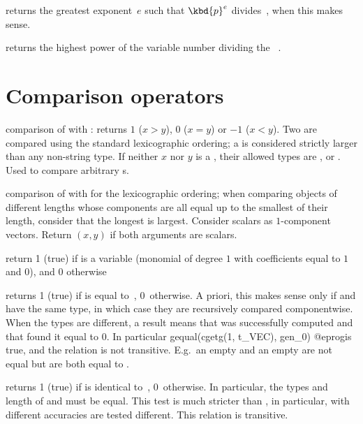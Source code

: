  returns the greatest exponent~$e$ such that
$\kbd{p}^e$ divides~, when this makes sense.

 returns the highest power of the variable
number  dividing the ~.

\section{Comparison operators}


 comparison of  with : returns
$1$ ($x > y$), $0$ ($x = y$) or $-1$ ($x < y$). Two 
are compared using the standard lexicographic ordering; a 
is considered strictly larger than any non-string type. If neither
$x$ nor $y$ is a , their allowed types are , 
or . Used  to compare arbitrary s.

 comparison of  with  for the
lexicographic ordering; when comparing objects of different lengths whose
components are all equal up to the smallest of their length, consider that
the longest is largest. Consider scalars as $1$-component vectors. Return
$(x,y)$ if both arguments are scalars.

 return 1 (true) if  is a variable
(monomial of degree $1$ with  coefficients equal to $1$ and $0$),
and $0$ otherwise

 returns 1 (true) if  is equal
to~, 0~otherwise. A priori, this makes sense only if  and
 have the same type, in which case they are recursively compared
componentwise. When the types are different, a  result
means that  was successfully computed and that
 found it equal to $0$. In particular
\bprog
  gequal(cgetg(1, t_VEC), gen_0)
@eprog\noindent is true, and the relation is not transitive. E.g.~an empty
 and an empty  are not equal but are both equal to
.

 returns 1 (true) if  is identical
to~, 0~otherwise. In particular, the types and length of  and
 must be equal. This test is much stricter than , in
particular,  with different accuracies are tested different. This
relation is transitive.

